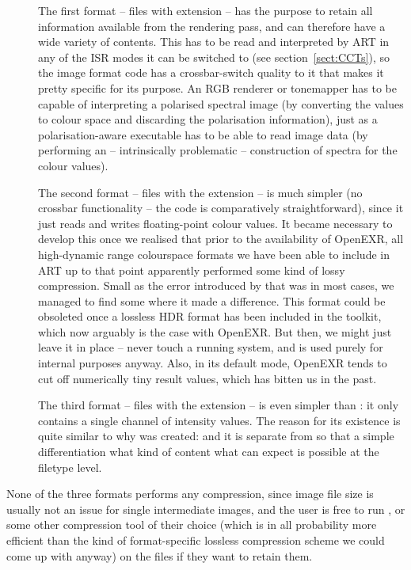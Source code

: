 \begin{description}
\item[] The first format -- files with extension
     -- has the purpose to retain all information
    available from the rendering pass, and can therefore have a wide
    variety of contents. This has to be read and interpreted by ART in any of the ISR modes it can be switched to (see section~\ref{sect:CCTs}), so the
    image format code has a crossbar-switch quality to it that makes
    it pretty specific for its purpose. An RGB renderer or tonemapper
    \eg has to be capable of interpreting a polarised spectral image
    (by converting the values to colour space and discarding the
    polarisation information), just as a polarisation-aware executable
    has to be able to read \eg {} image data (by
    performing an -- intrinsically problematic -- construction of
    spectra for the colour values).
    
  \item[] The second format -- files with the
    extension  -- is much simpler (no crossbar
    functionality -- the code is comparatively straightforward), since
    it just reads and writes floating-point colour values. It became
    necessary to develop this once we realised that prior to the availability of OpenEXR, all high-dynamic range colourspace
    formats we have been able to include in ART up to that point apparently
    performed some kind of lossy compression. Small as the error
    introduced by that was in most cases, we managed to find some
    where it made a difference. This format could be obsoleted once a
    lossless HDR format has been included in the toolkit, which now arguably is the case with OpenEXR. But then, we might just leave it in place -- never touch a running system, and 
    is used purely for internal purposes anyway. Also, in its default mode, OpenEXR tends to cut off numerically tiny result values, which has bitten us in the past.

  \item[] The third format -- files with the
    extension  -- is even simpler than : it only contains a single channel of intensity values. The reason for its existence is quite similar to why  was created: and it is separate from  so that a simple differentiation what kind of content what can expect is possible at the filetype level.

\end{description}
None of the three formats performs any compression, since image file size is usually not an issue for single intermediate images, and the user is free to run
,  or some other compression tool of their choice
(which is in all probability more efficient than the kind of format-specific
lossless compression scheme we could come up with anyway) on the files if they
want to retain them.

